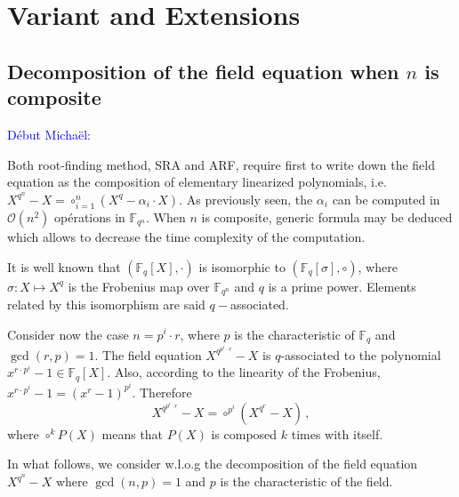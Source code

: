 \documentclass{sig-alternate}
\newcommand{\qq}{q}
\newcommand{\comd}{\noindent \textcolor{blue}{D\'ebut Micha\"el}:}
\begin{document}


\section{Variant and Extensions}





\subsection{Decomposition of the field equation when $n$ is composite}


\comd 



\noindent Both root-finding method, SRA and ARF, require first to write down the field equation as the composition of elementary linearized polynomials, i.e. $X^{q^n}-X=\circ_{i=1}^n (X^q-\alpha_i \cdot X)$.
As previously seen, the $\alpha_i$ can be computed in $\mathcal{O}(n^2)$ op\'erations in $\mathbb{F}_{q^n}$. When $n$ is composite, generic formula may be deduced 
which allows to decrease the time complexity of the computation.

\medskip   

\noindent It is well known that $(\mathbb{F}_q[X],\cdot)$ is isomorphic to  $(\mathbb{F}_q[\sigma], \circ)$, where $\sigma: X \mapsto X^q$ is the Frobenius map over $\mathbb{F}_{q^n}$  and $q$ is a prime power. 
Elements related by this isomorphism are said $q-$associated. 

\medskip

\noindent Consider now the case $n=p^i \cdot r$, where $p$ is the characteristic of $\mathbb{F}_q$ and $\gcd(r,p)=1$.  
The field equation $X^{q^{p^i \cdot r}}-X$ is $q$-associated to the polynomial $x^{r\cdot p^i}-1 \in \mathbb{F}_q[X]$. Also, according
 to the linearity of the Frobenius,  $x^{r \cdot p^i}-1=(x^r-1)^{p^i}$. Therefore 
$$X^{q^{p^i \cdot r}}-X=\circ^{p^i} (X^{q^r}-X)\,,$$
where $\circ^{k} P(X)$ means that $P(X)$ is composed $k$ times with itself. 

\medskip

\noindent In what follows, we consider w.l.o.g the decomposition of the field equation $X^{\qq^n}-X$ where $\gcd(n,p)=1$ and $p$ is the characteristic of the field.

\medskip
\end{document}
